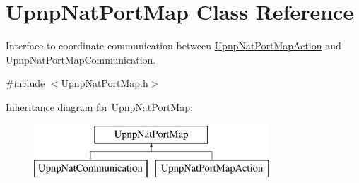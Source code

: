 \hypertarget{class_upnp_nat_port_map}{
\section{UpnpNatPortMap Class Reference}
\label{class_upnp_nat_port_map}
}


Interface to coordinate communication between \hyperlink{class_upnp_nat_port_map_action}{UpnpNatPortMapAction} and UpnpNatPortMapCommunication.  




{\ttfamily \#include $<$UpnpNatPortMap.h$>$}

Inheritance diagram for UpnpNatPortMap:\begin{figure}[H]
\begin{center}
\leavevmode
\includegraphics[height=2.000000cm]{class_upnp_nat_port_map}
\end{center}
\end{figure}
